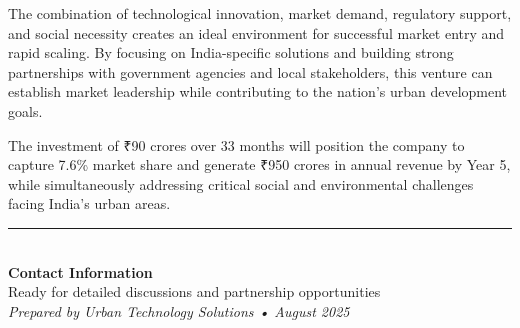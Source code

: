 \documentclass[11pt,a4paper]{article}
\begin{document}
The combination of technological innovation, market demand, regulatory support, and social necessity creates an ideal environment for successful market entry and rapid scaling. By focusing on India-specific solutions and building strong partnerships with government agencies and local stakeholders, this venture can establish market leadership while contributing to the nation's urban development goals.

The investment of ₹90 crores over 33 months will position the company to capture 7.6\% market share and generate ₹950 crores in annual revenue by Year 5, while simultaneously addressing critical social and environmental challenges facing India's urban areas.

\vfill

\begin{center}
\rule{0.8\textwidth}{0.5pt}\\
\vspace{0.5cm}
\textbf{Contact Information}\\
Ready for detailed discussions and partnership opportunities\\
\textit{Prepared by Urban Technology Solutions • August 2025}
\end{center}
\end{document}
